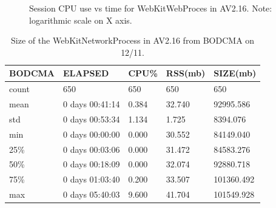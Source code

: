 \documentclass{article}
\begin{document}
\begin{figure}[H]
        \caption{\label{FIGURE-AV216WebKitWebCPUVsTime} Session CPU use vs time for WebKitWebProces in AV2.16. Note: logarithmic scale on X axis.}
\end{figure}



\begin{table}[H]
\begin{tabular}{|l|l|l|l|l|}
\hline BODCMA&                      ELAPSED&        CPU\%&     RSS(mb)&       SIZE(mb) \\
\hline count&                     650&  650&  650&     650 \\
\hline mean&   0 days 00:41:14&    0.384&   32.740&   92995.586 \\
\hline std&    0 days 00:53:34&    1.134&    1.725&    8394.076 \\
\hline min&           0 days 00:00:00&    0.000&   30.552&   84149.040 \\
\hline 25\% &          0 days 00:03:06&    0.000&   31.472&   84583.276 \\
\hline 50\%&           0 days 00:18:09&    0.000&   32.074&   92880.718 \\
\hline 75\%&    0 days 01:03:40&    0.200&   33.507&  101360.492 \\
\hline max&           0 days 05:40:03&    9.600&   41.704&  101549.928 \\
\hline 
\end{tabular}
\caption{\label{TABLE-AV216WebKitNet}Size of the WebKitNetworkProcess in AV2.16 from BODCMA on 12/11.} 
\end{table}
\end{document}
